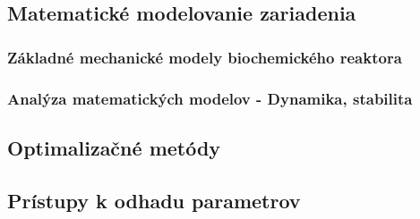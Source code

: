 \subsection{Matematické modelovanie zariadenia}

\subsubsection{Základné mechanické modely biochemického reaktora}

\subsubsection{Analýza matematických modelov - Dynamika, stabilita}

\subsection{Optimalizačné metódy}
\subsection{Prístupy k odhadu parametrov}
